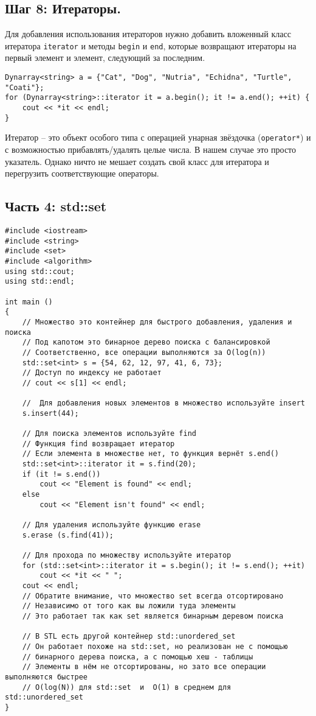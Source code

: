 \documentclass{article}
\begin{document}
\subsection*{Шаг 8: Итераторы.}
Для добавления использования итераторов нужно добавить вложенный класс итератора \texttt{iterator} и методы \texttt{begin} и \texttt{end}, которые возвращают итераторы на первый элемент и элемент, следующий за последним.
\begin{lstlisting}
Dynarray<string> a = {"Cat", "Dog", "Nutria", "Echidna", "Turtle", "Coati"};
for (Dynarray<string>::iterator it = a.begin(); it != a.end(); ++it) {
	cout << *it << endl;
}
\end{lstlisting}
Итератор -- это объект особого типа с операцией унарная звёздочка (\texttt{operator*}) и с возможностью прибавлять/удалять целые числа. В нашем случае это просто указатель. Однако ничто не мешает создать свой класс для итератора и перегрузить соответствующие операторы.


\iffalse
\newpage
\subsection*{Часть 4: std::set}
\begin{lstlisting}
#include <iostream>
#include <string>
#include <set>
#include <algorithm>
using std::cout;
using std::endl;

int main () 
{
    // Множество это контейнер для быстрого добавления, удаления и поиска
    // Под капотом это бинарное дерево поиска с балансировкой
    // Соответственно, все операции выполняются за O(log(n))
    std::set<int> s = {54, 62, 12, 97, 41, 6, 73};
    // Доступ по индексу не работает
    // cout << s[1] << endl;
    
    //  Для добавления новых элементов в множество используйте insert
    s.insert(44);
    
    // Для поиска элементов используйте find
    // Функция find возвращает итератор
    // Если элемента в множестве нет, то функция вернёт s.end()
    std::set<int>::iterator it = s.find(20);
    if (it != s.end())
        cout << "Element is found" << endl;
    else
        cout << "Element isn't found" << endl;
		
    // Для удаления используйте функцию erase
    s.erase (s.find(41));

    // Для прохода по множеству используйте итератор
    for (std::set<int>::iterator it = s.begin(); it != s.end(); ++it)
        cout << *it << " ";
    cout << endl;
    // Обратите внимание, что множество set всегда отсортировано
    // Независимо от того как вы ложили туда элементы
    // Это работает так как set является бинарным деревом поиска
    
    // В STL есть другой контейнер std::unordered_set
    // Он работает похоже на std::set, но реализован не с помощью
    // бинарного дерева поиска, а с помощью хеш - таблицы
    // Элементы в нём не отсортированы, но зато все операции выполняются быстрее
    // O(log(N)) для std::set  и  O(1) в среднем для std::unordered_set
}
\end{lstlisting}
\end{document}
